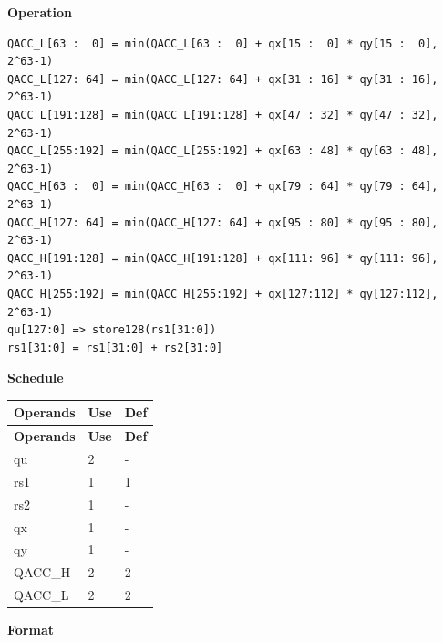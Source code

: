 \textbf{Operation}\\
\begin{lstlisting}
QACC_L[63 :  0] = min(QACC_L[63 :  0] + qx[15 :  0] * qy[15 :  0], 2^63-1)
QACC_L[127: 64] = min(QACC_L[127: 64] + qx[31 : 16] * qy[31 : 16], 2^63-1)
QACC_L[191:128] = min(QACC_L[191:128] + qx[47 : 32] * qy[47 : 32], 2^63-1)
QACC_L[255:192] = min(QACC_L[255:192] + qx[63 : 48] * qy[63 : 48], 2^63-1)
QACC_H[63 :  0] = min(QACC_H[63 :  0] + qx[79 : 64] * qy[79 : 64], 2^63-1)
QACC_H[127: 64] = min(QACC_H[127: 64] + qx[95 : 80] * qy[95 : 80], 2^63-1)
QACC_H[191:128] = min(QACC_H[191:128] + qx[111: 96] * qy[111: 96], 2^63-1)
QACC_H[255:192] = min(QACC_H[255:192] + qx[127:112] * qy[127:112], 2^63-1)
qu[127:0] => store128(rs1[31:0])
rs1[31:0] = rs1[31:0] + rs2[31:0]
\end{lstlisting}

\textbf{Schedule}\\
\begin{longtable}[c]{|l|l|l|}
    \hline
    \rowcolor{lightgray}
    \textbf{Operands} & \textbf{Use} & \textbf{Def} \\\hline
    \endfirsthead
    \hline
    \rowcolor{lightgray}
     \textbf{Operands} & \textbf{Use} & \textbf{Def} \\\hline
    \endhead
    \hline
    \endfoot

    qu & 2 & - \\\hline
    rs1 & 1 & 1 \\\hline
    rs2 & 1 & - \\\hline
     qx & 1 & - \\\hline
     qy & 1 & - \\\hline
     QACC\_H & 2 & 2 \\\hline
     QACC\_L & 2 & 2

\end{longtable}


\textbf{Format}\\

